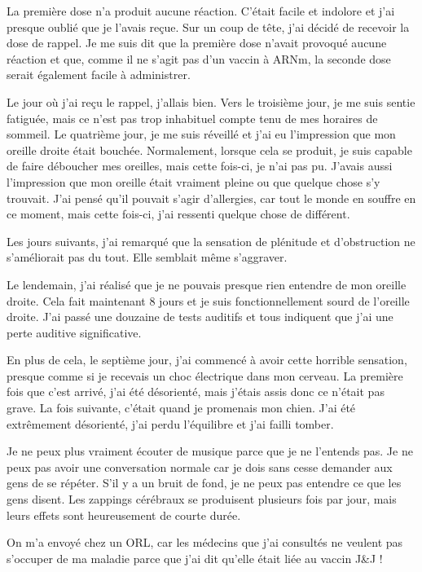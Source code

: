 La première dose n'a produit aucune réaction. C'était facile et indolore et j'ai
presque oublié que je l'avais reçue. Sur un coup de tête, j'ai décidé de
recevoir la dose de rappel. Je me suis dit que la première dose n'avait provoqué
aucune réaction et que, comme il ne s'agit pas d'un vaccin à ARNm, la seconde
dose serait également facile à administrer.

Le jour où j'ai reçu le rappel, j'allais bien. Vers le troisième jour, je me
suis sentie fatiguée, mais ce n'est pas trop inhabituel compte tenu de mes
horaires de sommeil. Le quatrième jour, je me suis réveillé et j'ai eu
l'impression que mon oreille droite était bouchée. Normalement, lorsque cela se
produit, je suis capable de faire déboucher mes oreilles, mais cette fois-ci, je
n'ai pas pu. J'avais aussi l'impression que mon oreille était vraiment pleine ou
que quelque chose s'y trouvait. J'ai pensé qu'il pouvait s'agir d'allergies, car
tout le monde en souffre en ce moment, mais cette fois-ci, j'ai ressenti quelque
chose de différent.

Les jours suivants, j'ai remarqué que la sensation de plénitude et d'obstruction
ne s'améliorait pas du tout. Elle semblait même s'aggraver.

Le lendemain, j'ai réalisé que je ne pouvais presque rien entendre de mon
oreille droite. Cela fait maintenant 8 jours et je suis fonctionnellement sourd
de l'oreille droite. J'ai passé une douzaine de tests auditifs et tous indiquent
que j'ai une perte auditive significative.

En plus de cela, le septième jour, j'ai commencé à avoir cette horrible
sensation, presque comme si je recevais un choc électrique dans mon cerveau. La
première fois que c'est arrivé, j'ai été désorienté, mais j'étais assis donc ce
n'était pas grave. La fois suivante, c'était quand je promenais mon chien. J'ai
été extrêmement désorienté, j'ai perdu l'équilibre et j'ai failli tomber.

Je ne peux plus vraiment écouter de musique parce que je ne l'entends pas. Je ne
peux pas avoir une conversation normale car je dois sans cesse demander aux gens
de se répéter. S'il y a un bruit de fond, je ne peux pas entendre ce que les
gens disent. Les zappings cérébraux se produisent plusieurs fois par jour, mais
leurs effets sont heureusement de courte durée.

On m'a envoyé chez un ORL, car les médecins que j'ai consultés ne veulent pas
s'occuper de ma maladie parce que j'ai dit qu'elle était liée au vaccin J\&J !
